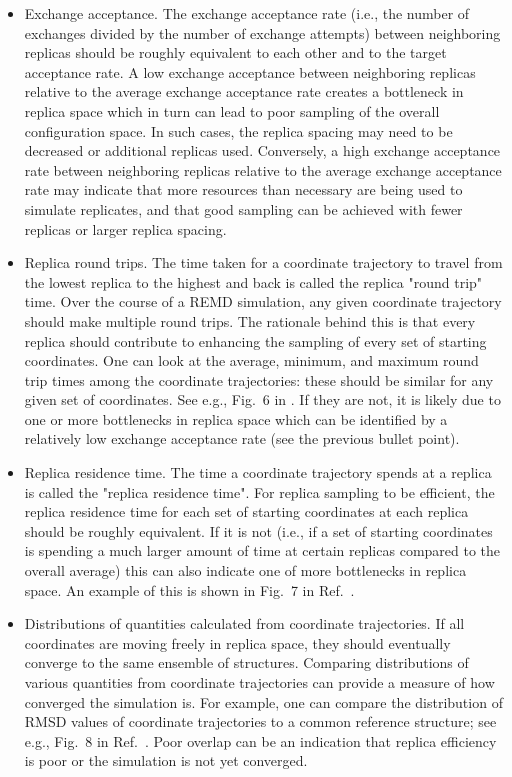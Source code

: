 \begin{itemize}
  \item Exchange acceptance. The exchange acceptance rate (i.e., the number of exchanges divided by the number of exchange attempts) between neighboring replicas should be roughly equivalent to each other and to the target acceptance rate. A low exchange acceptance between neighboring replicas relative to the average exchange acceptance rate creates a bottleneck in replica space which in turn can lead to poor sampling of the overall configuration space.  In such cases, the replica spacing may need to be decreased or additional replicas used.  Conversely, a high exchange acceptance rate between neighboring replicas relative to the average exchange acceptance rate may indicate that more resources than necessary are being used to simulate replicates, and that good sampling can be achieved with fewer replicas or larger replica spacing.  
  \item Replica round trips. The time taken for a coordinate trajectory to travel from the lowest replica to the highest and back is called the replica "round trip" time. Over the course of a REMD simulation, any given coordinate trajectory should make multiple round trips. The rationale behind this is that every replica should contribute to enhancing the sampling of every set of starting coordinates.
One can look at the average, minimum, and maximum round trip times among the coordinate trajectories: these should be similar for any given set of coordinates. See e.g., Fig.\ 6 in \citep{Roe2014}. %
If they are not, it is likely due to one or more bottlenecks in replica space which can be identified by a relatively low exchange acceptance rate (see the previous bullet point).
  \item Replica residence time. The time a coordinate trajectory spends at a replica is called the "replica residence time". For replica sampling to be efficient, the replica residence time for each set of starting coordinates at each replica should be roughly equivalent. If it is not (i.e., if a set of starting coordinates is spending a much larger amount of time at certain replicas compared to the overall average) this can also indicate one of more bottlenecks in replica space. An example of this is shown in Fig.\ 7 in Ref.\ \citep{Roe2014}. 
  \item Distributions of quantities calculated from coordinate trajectories. If all coordinates are moving freely in replica space, they should eventually converge to the same ensemble of structures. Comparing distributions of various quantities from coordinate trajectories can provide a measure of how converged the simulation is. For example, one can compare the distribution of RMSD values of coordinate trajectories to a common reference structure; see e.g., Fig.\ 8 in Ref.\ \citep{Henriksen2013}. Poor overlap can be an indication that replica efficiency is poor or the simulation is not yet converged.
\end{itemize}

